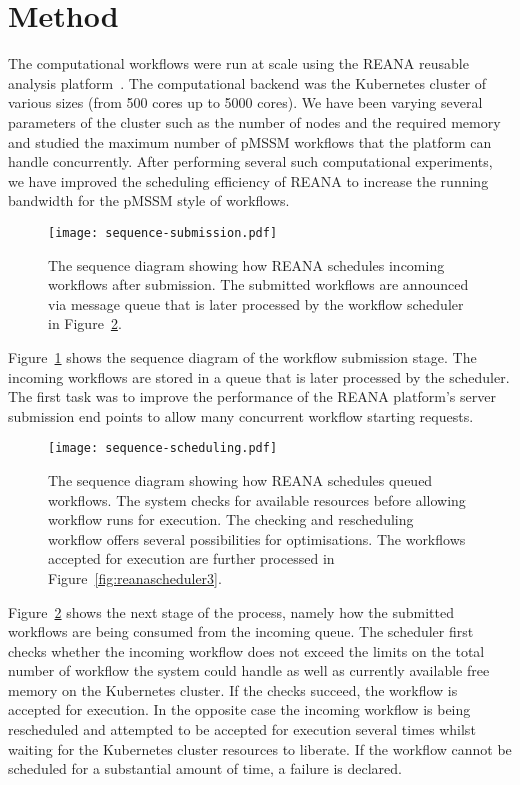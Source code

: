 \section{Method}\label{sec:method}

The computational workflows were run at scale using the REANA reusable analysis platform~\cite{Simko:2018zzz}.
The computational backend was the Kubernetes cluster of various sizes (from 500 cores up to 5000 cores).
We have been varying several parameters of the cluster such as the number of nodes and the required memory and studied the maximum number of pMSSM workflows that the platform can handle concurrently.
After performing several such computational experiments, we have improved the scheduling efficiency of REANA to increase the running bandwidth for the pMSSM style of workflows.

\begin{figure}
\centering
\texttt{[image: sequence-submission.pdf]}
\caption{The sequence diagram showing how REANA schedules incoming workflows after submission.
The submitted workflows are announced via message queue that is later processed by the workflow scheduler in Figure~\ref{fig:reanascheduler2}.}
\label{fig:reanascheduler1}
\end{figure}

Figure~\ref{fig:reanascheduler1} shows the sequence diagram of the workflow submission stage.
The incoming workflows are stored in a queue that is later processed by the scheduler.
The first task was to improve the performance of the REANA platform's server submission end points to allow many concurrent workflow starting requests.

\begin{figure}
\centering
\texttt{[image: sequence-scheduling.pdf]}
\caption{The sequence diagram showing how REANA schedules queued workflows.
The system checks for available resources before allowing workflow runs for execution.
The checking and rescheduling workflow offers several possibilities for optimisations.
The workflows accepted for execution are further processed in Figure~\ref{fig:reanascheduler3}.}
\label{fig:reanascheduler2}
\end{figure}

Figure~\ref{fig:reanascheduler2} shows the next stage of the process, namely how the submitted workflows are being consumed from the incoming queue.
The scheduler first checks whether the incoming workflow does not exceed the limits on the total number of workflow the system could handle as well as currently available free memory on the Kubernetes cluster.
If the checks succeed, the workflow is accepted for execution.
In the opposite case the incoming workflow is being rescheduled and attempted to be accepted for execution several times whilst waiting for the Kubernetes cluster resources to liberate.
If the workflow cannot be scheduled for a substantial amount of time, a failure is declared.


